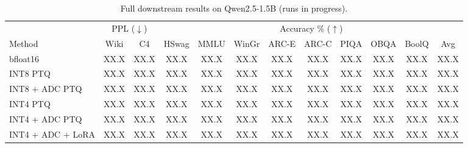 \documentclass[letterpaper]{article} %
\theoremstyle{plain}
\newcommand{\phnum}{XX.X}
\begin{document}
\begin{table}[t]
\centering
\setlength{\tabcolsep}{4pt}
\begin{tabular}{l|cc|ccccccccc}
\toprule
 & \multicolumn{2}{c|}{PPL ($\downarrow$)} & \multicolumn{9}{c}{Accuracy \% ($\uparrow$)} \\
Method & Wiki & C4 & HSwag & MMLU & WinGr & ARC-E & ARC-C & PIQA & OBQA & BoolQ & Avg \\
\midrule
bfloat16          & \phnum & \phnum & \phnum & \phnum & \phnum & \phnum & \phnum & \phnum & \phnum & \phnum & \phnum \\ %
INT8 PTQ          & \phnum & \phnum & \phnum & \phnum & \phnum & \phnum & \phnum & \phnum & \phnum & \phnum & \phnum \\ %
INT8 + ADC PTQ    & \phnum & \phnum & \phnum & \phnum & \phnum & \phnum & \phnum & \phnum & \phnum & \phnum & \phnum \\ %
INT4 PTQ          & \phnum & \phnum & \phnum & \phnum & \phnum & \phnum & \phnum & \phnum & \phnum & \phnum & \phnum \\ %
INT4 + ADC PTQ    & \phnum & \phnum & \phnum & \phnum & \phnum & \phnum & \phnum & \phnum & \phnum & \phnum & \phnum \\ %
INT4 + ADC + LoRA & \phnum & \phnum & \phnum & \phnum & \phnum & \phnum & \phnum & \phnum & \phnum & \phnum & \phnum \\ %
\bottomrule
\end{tabular}
\caption{Full downstream results on Qwen2.5-1.5B (runs in progress).}
\label{tab:downstream_qwen}
\end{table}
\end{document}
